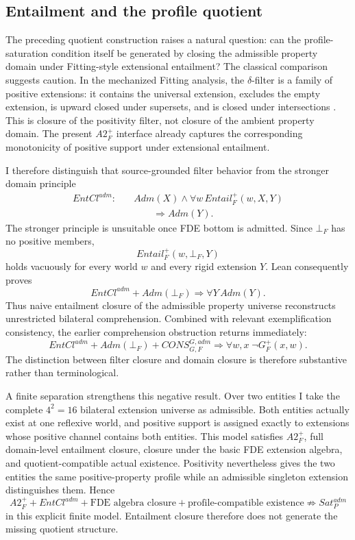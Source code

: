 \subsection{Entailment and the profile quotient}
\label{sec:fitting-entailment-quotient}

The preceding quotient construction raises a natural question: can the profile-saturation condition itself be generated by closing the admissible property domain under Fitting-style extensional entailment? The classical comparison suggests caution. In the mechanized Fitting analysis, the \(\delta\)-filter is a family of positive extensions: it contains the universal extension, excludes the empty extension, is upward closed under supersets, and is closed under intersections \cite{BenzmuellerFuenmayor2019}. This is closure of the positivity filter, not closure of the ambient property domain. The present \(A2_F^+\) interface already captures the corresponding monotonicity of positive support under extensional entailment.

I therefore distinguish that source-grounded filter behavior from the stronger domain principle
\[
\begin{split}
  EntCl^{adm}:\quad
  &Adm(X)\land
  \forall w\,Entail_F^+(w,X,Y)\\
  &\qquad\Longrightarrow Adm(Y).
\end{split}
\]
The stronger principle is unsuitable once FDE bottom is admitted. Since \(\bot_F\) has no positive members,
\[
  Entail_F^+(w,\bot_F,Y)
\]
holds vacuously for every world \(w\) and every rigid extension \(Y\). Lean consequently proves
\[
\boxed{
  EntCl^{adm}+Adm(\bot_F)
  \Longrightarrow
  \forall Y\,Adm(Y).
}
\]
Thus naive entailment closure of the admissible property universe reconstructs unrestricted bilateral comprehension. Combined with relevant exemplification consistency, the earlier comprehension obstruction returns immediately:
\[
\boxed{
  EntCl^{adm}+Adm(\bot_F)+CONS_{G,F}^{G,adm}
  \Longrightarrow
  \forall w,x\;\neg G_F^+(x,w).
}
\]
The distinction between filter closure and domain closure is therefore substantive rather than terminological.

A finite separation strengthens this negative result. Over two entities I take the complete \(4^2=16\) bilateral extension universe as admissible. Both entities actually exist at one reflexive world, and positive support is assigned exactly to extensions whose positive channel contains both entities. This model satisfies \(A2_F^+\), full domain-level entailment closure, closure under the basic FDE extension algebra, and quotient-compatible actual existence. Positivity nevertheless gives the two entities the same positive-property profile while an admissible singleton extension distinguishes them. Hence
\[
\boxed{
  A2_F^+
  +EntCl^{adm}
  +\text{FDE algebra closure}
  +\text{profile-compatible existence}
  \not\Longrightarrow Sat_P^{adm}
}
\]
in this explicit finite model. Entailment closure therefore does not generate the missing quotient structure.

